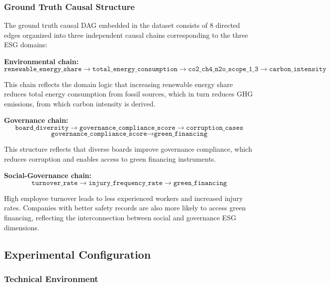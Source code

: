 \documentclass[a4paper,11pt,oneside]{article}
\begin{document}
\subsubsection{Ground Truth Causal Structure}

The ground truth causal DAG embedded in the dataset consists of 8 directed edges organized into three independent causal chains corresponding to the three ESG domains:

\textbf{Environmental chain:}
\begin{equation}
\texttt{renewable\_energy\_share} \rightarrow \texttt{total\_energy\_consumption} \rightarrow \texttt{co2\_ch4\_n2o\_scope\_1\_3} \rightarrow \texttt{carbon\_intensity}
\end{equation}

This chain reflects the domain logic that increasing renewable energy share reduces total energy consumption from fossil sources, which in turn reduces GHG emissions, from which carbon intensity is derived.

\textbf{Governance chain:}
\begin{equation}
\texttt{board\_diversity} \rightarrow \texttt{governance\_compliance\_score} \rightarrow \texttt{corruption\_cases}
\end{equation}
\begin{equation}
\texttt{governance\_compliance\_score} \rightarrow \texttt{green\_financing}
\end{equation}

This structure reflects that diverse boards improve governance compliance, which reduces corruption and enables access to green financing instruments.

\textbf{Social-Governance chain:}
\begin{equation}
\texttt{turnover\_rate} \rightarrow \texttt{injury\_frequency\_rate} \rightarrow \texttt{green\_financing}
\end{equation}

High employee turnover leads to less experienced workers and increased injury rates. Companies with better safety records are also more likely to access green financing, reflecting the interconnection between social and governance ESG dimensions.

\subsection{Experimental Configuration}

\subsubsection{Technical Environment}
\end{document}
